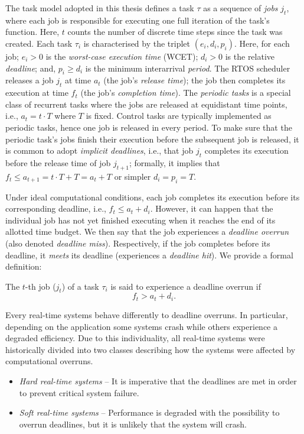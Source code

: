 The task model adopted in this thesis defines a task $\tau$ as a sequence of \emph{jobs} $j_t$, where each job is responsible for executing one full iteration of the task's function.
Here, $t$ counts the number of discrete time steps since the task was created.
Each task $\tau_i$ is characterised by the triplet $(e_i, d_i, p_i)$.
Here, for each job; $e_i > 0$ is the \emph{worst-case execution time} (WCET); $d_i > 0$ is the relative \emph{deadline}; and, $p_i \geq d_i$ is the minimum interarrival \emph{period}.
The RTOS scheduler releases a job $j_t$ at time $a_t$ (the job's \emph{release time}); the job then completes its execution at time $f_t$ (the job's \emph{completion time}).
The \emph{periodic tasks} is a special class of recurrent tasks where the jobs are released at equidistant time points, i.e., $a_t = t\cdot T$ where $T$ is fixed. 
Control tasks are typically implemented as periodic tasks, hence one job is released in every period.
To make sure that the periodic task's jobs finish their execution before the subsequent job is released, it is common to adopt \emph{implicit deadlines}, i.e., that job $j_t$ completes its execution before the release time of job $j_{t+1}$; formally, it implies that $f_t \leq a_{t+1} = t\cdot T+T = a_t + T$ or simpler $d_i = p_i = T$.

Under ideal computational conditions, each job completes its execution before its corresponding deadline, i.e., $f_t \leq a_t + d_i$.
However, it can happen that the individual job has not yet finished executing when it reaches the end of its allotted time budget.
We then say that the job experiences a \emph{deadline overrun} (also denoted \emph{deadline miss}).
Respectively, if the job completes before its deadline, it \emph{meets} its deadline (experiences a \emph{deadline hit}).
We provide a formal definition:
%
\begin{definition}%
    \label{def:overrun}%
    The $t$-th job ($j_t$) of a task $\tau_i$ is said to experience a deadline overrun if
    \begin{equation}
        f_t > a_t + d_i.
    \end{equation}
\end{definition}
%

Every real-time systems behave differently to deadline overruns.
In particular, depending on the application some systems crash while others experience a degraded efficiency.
Due to this individuality, all real-time systems were historically divided into two classes describing how the systems were affected by computational overruns.
%
\begin{itemize}
    \item \emph{Hard real-time systems} -- It is imperative that the deadlines are met in order to prevent critical system failure.

    \item \emph{Soft real-time systems} -- Performance is degraded with the possibility to overrun deadlines, but it is unlikely that the system will crash.
\end{itemize}


